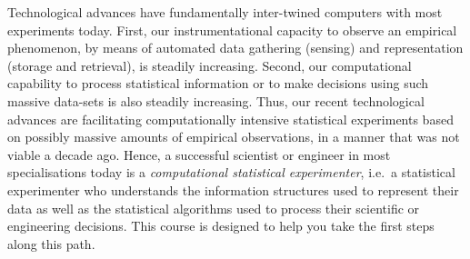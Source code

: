 Technological advances have fundamentally inter-twined computers with most experiments today.  First, our instrumentational capacity to observe an empirical phenomenon, by means of automated data gathering (sensing) and representation (storage and retrieval), is steadily increasing.  Second, our computational capability to process statistical information or to make decisions using such massive data-sets is also steadily increasing.  Thus, our recent technological advances are facilitating computationally intensive statistical experiments based on possibly massive amounts of empirical observations, in a manner that was not viable a decade ago.  Hence, a successful scientist or engineer in most specialisations today is a {\it computational statistical experimenter}, i.e.~a statistical experimenter who understands the information structures used to represent their data as well as the statistical algorithms used to process their scientific or engineering decisions.  This course is designed to help you take the first steps along this path.

